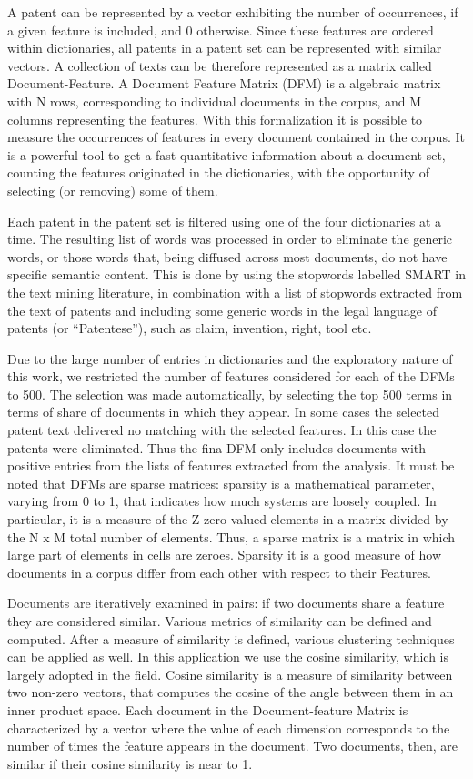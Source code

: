 \documentclass[]{book}
\begin{document}
A patent can be represented by a vector exhibiting the number of
occurrences, if a given feature is included, and 0 otherwise. Since
these features are ordered within dictionaries, all patents in a patent
set can be represented with similar vectors. A collection of texts can
be therefore represented as a matrix called Document-Feature. A Document
Feature Matrix (DFM) is a algebraic matrix with N rows, corresponding to
individual documents in the corpus, and M columns representing the
features. With this formalization it is possible to measure the
occurrences of features in every document contained in the corpus. It is
a powerful tool to get a fast quantitative information about a document
set, counting the features originated in the dictionaries, with the
opportunity of selecting (or removing) some of them.

Each patent in the patent set is filtered using one of the four
dictionaries at a time. The resulting list of words was processed in
order to eliminate the generic words, or those words that, being
diffused across most documents, do not have specific semantic content.
This is done by using the stopwords labelled SMART in the text mining
literature, in combination with a list of stopwords extracted from the
text of patents and including some generic words in the legal language
of patents (or ``Patentese''), such as claim, invention, right, tool
etc.

Due to the large number of entries in dictionaries and the exploratory
nature of this work, we restricted the number of features considered for
each of the DFMs to 500. The selection was made automatically, by
selecting the top 500 terms in terms of share of documents in which they
appear. In some cases the selected patent text delivered no matching
with the selected features. In this case the patents were eliminated.
Thus the fina DFM only includes documents with positive entries from the
lists of features extracted from the analysis. It must be noted that
DFMs are sparse matrices: sparsity is a mathematical parameter, varying
from 0 to 1, that indicates how much systems are loosely coupled. In
particular, it is a measure of the Z zero-valued elements in a matrix
divided by the N x M total number of elements. Thus, a sparse matrix is
a matrix in which large part of elements in cells are zeroes. Sparsity
it is a good measure of how documents in a corpus differ from each other
with respect to their Features.

Documents are iteratively examined in pairs: if two documents share a
feature they are considered similar. Various metrics of similarity can
be defined and computed. After a measure of similarity is defined,
various clustering techniques can be applied as well. In this
application we use the cosine similarity, which is largely adopted in
the field. Cosine similarity is a measure of similarity between two
non-zero vectors, that computes the cosine of the angle between them in
an inner product space. Each document in the Document-feature Matrix is
characterized by a vector where the value of each dimension corresponds
to the number of times the feature appears in the document. Two
documents, then, are similar if their cosine similarity is near to 1.
\end{document}
